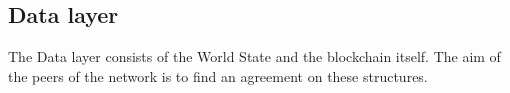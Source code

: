 \subsection{Data layer}
The Data layer consists of the World State and the blockchain itself.
The aim of the peers of the network is to find an agreement on these
structures.
